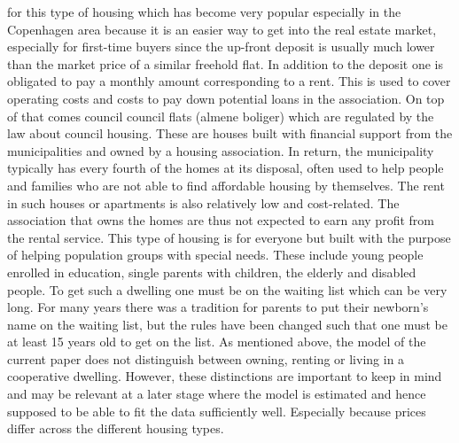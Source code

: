 for this type of housing which has become very popular especially in the Copenhagen area because it is an easier way to get into the real estate market, especially for first-time buyers since the up-front deposit is usually much lower than the market price of a similar freehold flat. In addition to the deposit one is obligated to pay a monthly amount corresponding to a rent. This is used to cover operating costs and costs to pay down potential loans in the association. On top of that comes council council flats (almene boliger) which are regulated by the law about council housing. These are houses built with financial support from the municipalities and owned by a housing association. In return, the municipality typically has every fourth of the homes at its disposal, often used to help people and families who are not able to find affordable housing by themselves. The rent in such houses or apartments is also relatively low and cost-related. The association that owns the homes are thus not expected to earn any profit from the rental service. This type of housing is for everyone but built with the purpose of helping population groups with special needs. These include young people enrolled in education, single parents with children, the elderly and disabled people. To get such a dwelling one must be on the waiting list which can be very long. For many years there was a tradition for parents to put their newborn's name on the waiting list, but the rules have been changed such that one must be at least 15 years old to get on the list. As mentioned above, the model of the current paper does not distinguish between owning, renting or living in a cooperative dwelling. However, these distinctions are important to keep in mind and may be relevant at a later stage where the model is estimated and hence supposed to be able to fit the data sufficiently well. Especially because prices differ across the different housing types.

